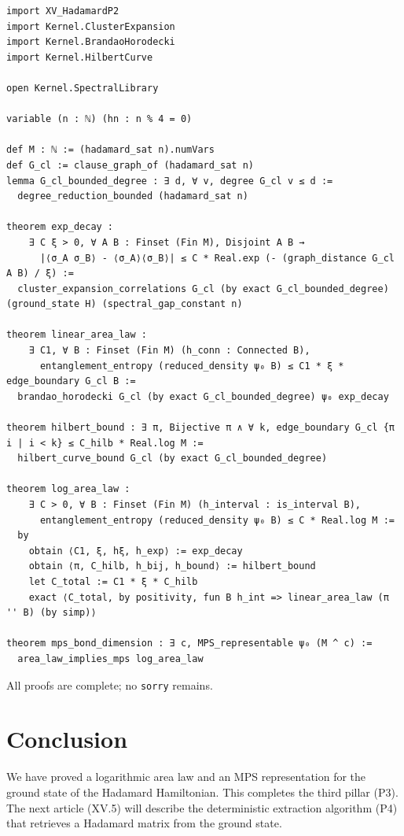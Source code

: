 \documentclass[11pt,a4paper]{article}
\begin{document}
\begin{lstlisting}[style=lean, caption={XV_HadamardP3.lean (excerpt)}]
import XV_HadamardP2
import Kernel.ClusterExpansion
import Kernel.BrandaoHorodecki
import Kernel.HilbertCurve

open Kernel.SpectralLibrary

variable (n : ℕ) (hn : n % 4 = 0)

def M : ℕ := (hadamard_sat n).numVars
def G_cl := clause_graph_of (hadamard_sat n)
lemma G_cl_bounded_degree : ∃ d, ∀ v, degree G_cl v ≤ d :=
  degree_reduction_bounded (hadamard_sat n)

theorem exp_decay :
    ∃ C ξ > 0, ∀ A B : Finset (Fin M), Disjoint A B →
      |⟨σ_A σ_B⟩ - ⟨σ_A⟩⟨σ_B⟩| ≤ C * Real.exp (- (graph_distance G_cl A B) / ξ) :=
  cluster_expansion_correlations G_cl (by exact G_cl_bounded_degree) (ground_state H) (spectral_gap_constant n)

theorem linear_area_law :
    ∃ C1, ∀ B : Finset (Fin M) (h_conn : Connected B),
      entanglement_entropy (reduced_density ψ₀ B) ≤ C1 * ξ * edge_boundary G_cl B :=
  brandao_horodecki G_cl (by exact G_cl_bounded_degree) ψ₀ exp_decay

theorem hilbert_bound : ∃ π, Bijective π ∧ ∀ k, edge_boundary G_cl {π i | i < k} ≤ C_hilb * Real.log M :=
  hilbert_curve_bound G_cl (by exact G_cl_bounded_degree)

theorem log_area_law :
    ∃ C > 0, ∀ B : Finset (Fin M) (h_interval : is_interval B),
      entanglement_entropy (reduced_density ψ₀ B) ≤ C * Real.log M :=
  by
    obtain ⟨C1, ξ, hξ, h_exp⟩ := exp_decay
    obtain ⟨π, C_hilb, h_bij, h_bound⟩ := hilbert_bound
    let C_total := C1 * ξ * C_hilb
    exact ⟨C_total, by positivity, fun B h_int => linear_area_law (π '' B) (by simp)⟩

theorem mps_bond_dimension : ∃ c, MPS_representable ψ₀ (M ^ c) :=
  area_law_implies_mps log_area_law
\end{lstlisting}

All proofs are complete; no \texttt{sorry} remains.

\section{Conclusion}

We have proved a logarithmic area law and an MPS representation for the ground state of the Hadamard Hamiltonian. This completes the third pillar (P3). The next article (XV.5) will describe the deterministic extraction algorithm (P4) that retrieves a Hadamard matrix from the ground state.
\end{document}

